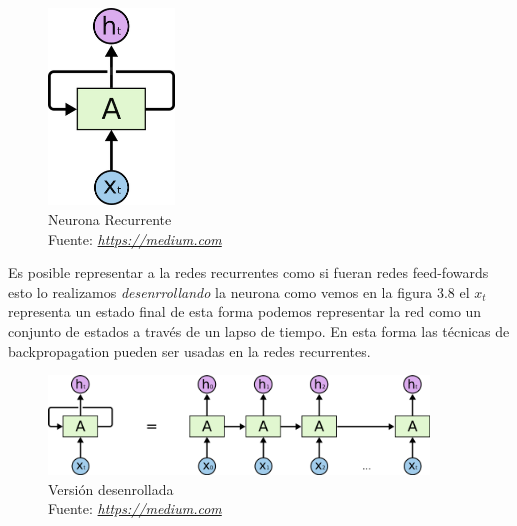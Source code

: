 \begin{figure}[H]
	\centering
	\includegraphics[width=0.3\textwidth]{Figures/rnn.png}
	\caption{Neurona Recurrente \\ Fuente:  \href{https://cdn-images-1.medium.com/max/960/1*XB5c4rTCSeFQrK0aFC5IVw.png}{\textit{https://medium.com}}}
	\label{}
\end{figure}

Es posible representar a la redes recurrentes como si fueran redes feed-fowards esto lo realizamos \textit{desenrrollando} la neurona como vemos en la figura 3.8 el $x_{t}$ representa un estado final de esta forma podemos representar la red como un conjunto de estados a través de un lapso de tiempo. En esta forma las técnicas de backpropagation pueden ser usadas en la redes recurrentes.

\begin{figure}[H]
	\centering
	\includegraphics[width=0.9\textwidth]{Figures/rnn2.png}
	\caption{Versión desenrollada \\ Fuente:  \href{https://cdn-images-1.medium.com/max/960/1*XB5c4rTCSeFQrK0aFC5IVw.png}{\textit{https://medium.com}}}
	\label{}
\end{figure}



\afterpage{\blankpage}